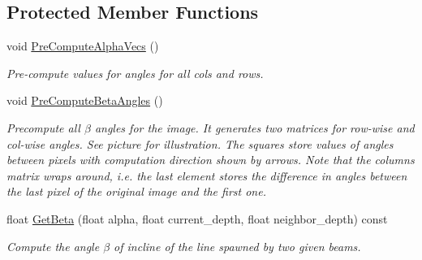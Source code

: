 \subsection*{Protected Member Functions}
\begin{DoxyCompactItemize}
\item 
\hypertarget{classdepth__clustering_1_1AngleDiffPrecomputed_a8f333b5196e9dcaa7923f82d362c7281}{void \hyperlink{classdepth__clustering_1_1AngleDiffPrecomputed_a8f333b5196e9dcaa7923f82d362c7281}{Pre\-Compute\-Alpha\-Vecs} ()}\label{classdepth__clustering_1_1AngleDiffPrecomputed_a8f333b5196e9dcaa7923f82d362c7281}

\begin{DoxyCompactList}\small\item\em Pre-\/compute values for angles for all cols and rows. \end{DoxyCompactList}\item 
void \hyperlink{classdepth__clustering_1_1AngleDiffPrecomputed_aeb86ee61c6e8fc1b5b554368b1f5fa27}{Pre\-Compute\-Beta\-Angles} ()
\begin{DoxyCompactList}\small\item\em Precompute all $\beta$ angles for the image. It generates two matrices for row-\/wise and col-\/wise angles. See picture for illustration. The squares store values of angles between pixels with computation direction shown by arrows. Note that the columns matrix wraps around, i.\-e. the last element stores the difference in angles between the last pixel of the original image and the first one. \end{DoxyCompactList}\item 
float \hyperlink{classdepth__clustering_1_1AngleDiffPrecomputed_a717fd502674b9a61d29382e5a2cfbaee}{Get\-Beta} (float alpha, float current\-\_\-depth, float neighbor\-\_\-depth) const 
\begin{DoxyCompactList}\small\item\em Compute the angle $\beta$ of incline of the line spawned by two given beams. \end{DoxyCompactList}\end{DoxyCompactItemize}
